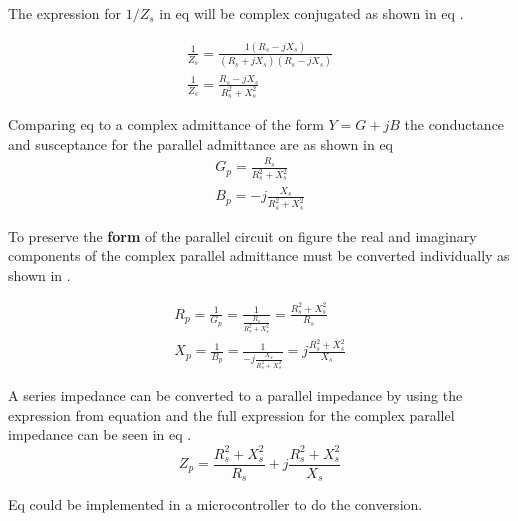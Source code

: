 The expression for $1/Z_s$ in eq  will be complex conjugated as shown in eq .

\begin{equation}\label{eq:4_1_5_ParallelModely2}
    \begin{split}
    \frac{1}{Z_s} = \frac{1(R_s - jX_s)}{(R_s + jX_s)(R_s - jX_s)}  \\
    \frac{1}{Z_s} = \frac{R_s - jX_s}{R_s^2+X_s^2} 
    \end{split}
\end{equation}

Comparing eq  to a complex admittance of the form $Y = G + jB$ the conductance and susceptance for the parallel admittance are as shown in eq
\begin{equation}\label{eq:4_1_5_ParallelModely3}
    \begin{split}
    G_p = \frac{R_s}{R_s^2 + X_s^2} \\
    B_p = -j\frac{X_s}{R_s^2 + X_s^2}
    \end{split}
\end{equation}

To preserve the \textbf{form} of the parallel circuit on figure  the real and imaginary components of the complex parallel admittance must be converted individually as shown in .

\begin{equation}\label{eq:4_1_5_ParallelModely4}
    \begin{split}
    R_p = \frac{1}{G_p} = \frac{1}{\frac{R_s}{R_s^2 + X_s^2}} = \frac{R_s^2 + X_s^2}{R_s} \\
    X_p = \frac{1}{B_p} = \frac{1}{-j\frac{X_s}{R_s^2 + X_s^2}} = j\frac{R_s^2+X_s^2}{X_s}
    \end{split}
\end{equation}

A series impedance can be converted to a parallel impedance by using the expression from equation  and the full expression for the complex parallel impedance can be seen in eq .
\begin{equation}\label{eq:4_1_5_ParallelModely5}
       Z_p = \frac{R_s^2 + X_s^2}{R_s} + j\frac{R_s^2+X_s^2}{X_s} 
\end{equation}

Eq  could be implemented in a microcontroller to do the conversion.

